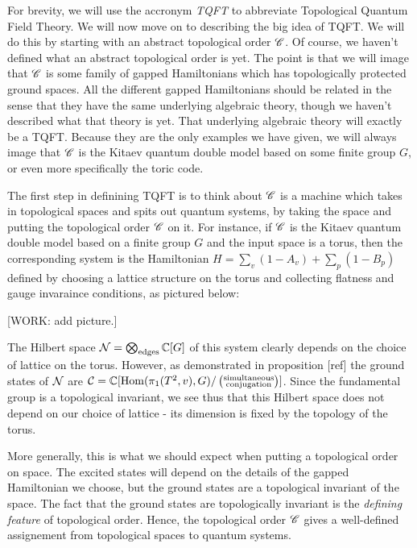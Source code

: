 For brevity, we will use the accronym \textit{TQFT} to abbreviate Topological Quantum Field Theory. We will now move on to describing the big idea of TQFT. We will do this by starting with an abstract topological order $\mathscr{C}$. Of course, we haven't defined what an abstract topological order is yet. The point is that we will image that $\mathscr{C}$ is some family of gapped Hamiltonians which has topologically protected ground spaces. All the different gapped Hamiltonians should be related in the sense that they have the same underlying algebraic theory, though we haven't described what that theory is yet. That underlying algebraic theory will exactly be a TQFT. Because they are the only examples we have given, we will always image that $\mathscr{C}$ is the Kitaev quantum double model based on some finite group $G$, or even more specifically the toric code.

The first step in definining TQFT is to think about $\mathscr{C}$ is a machine which takes in topological spaces and spits out quantum systems, by taking the space and putting the topological order $\mathscr{C}$ on it. For instance, if $\mathscr{C}$ is the Kitaev quantum double model based on a finite group $G$ and the input space is a torus, then the corresponding system is the Hamiltonian $H=\sum_{v}(1-A_v)+\sum_{p}(1-B_p)$ defined by choosing a lattice structure on the torus and collecting flatness and gauge invaraince conditions, as pictured below:

[WORK: add picture.]

The Hilbert space $\mathcal{N}=\bigotimes_{\text{edges}}\mathbb{C}[G]$ of this system clearly depends on the choice of lattice on the torus. However, as demonstrated in proposition [ref] the ground states of $\mathcal{N}$ are $\mathcal{C}=\mathbb{C}[\operatorname{Hom}(\pi_1(T^2,v), G)/\left(\substack{\text{simultaneous} \\ \text{conjugation}}\right)]$. Since the fundamental group is a topological invariant, we see thus that this Hilbert space does not depend on our choice of lattice - its dimension is fixed by the topology of the torus.

More generally, this is what we should expect when putting a topological order on space. The excited states will depend on the details of the gapped Hamiltonian we choose, but the ground states are a topological invariant of the space. The fact that the ground states are topologically invariant is the \textit{defining feature} of topological order. Hence, the topological order $\mathscr{C}$ gives a well-defined assignement from topological spaces to quantum systems.

